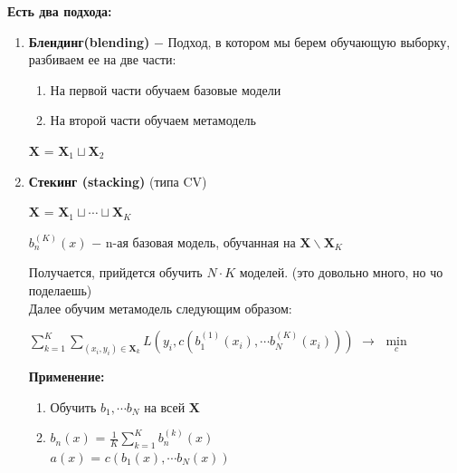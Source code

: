             \textbf{Есть два подхода:}
            \begin{enumerate}
                \item \textbf{Блендинг(blending)} $-$ Подход, в котором мы берем обучающую выборку, разбиваем ее на две части:
                \begin{enumerate}
                    \item На первой части обучаем базовые модели
                    \item На второй части обучаем метамодель
                \end{enumerate}

                \begin{center}
                    $\mathbf{X}$ = $\mathbf{X}_1 \sqcup \mathbf{X}_2$ 
                \end{center}

                \item \textbf{Стекинг (stacking)} (типа CV)\\

                    \begin{center}
                        $\mathbf{X}$ = $\mathbf{X}_1 \sqcup \cdots \sqcup \mathbf{X}_K$
                    \end{center}

                    \begin{center}
                        $b_n^{(K)}(x)$ $-$ n-ая базовая модель, обучанная на $\mathbf{X} \backslash \mathbf{X}_K$
                    \end{center}

                    Получается, прийдется обучить $N \cdot K$ моделей. (это довольно много, но чо поделаешь)\\

                    Далее обучим метамодель следующим образом:
                    \begin{center}
                        \large
                        $\sum\limits_{k = 1}^K\sum\limits_{(x_i, y_i) \in \mathbf{X}_k}L(y_i, c(b_1^{(1)}(x_i), \cdots b_N^{(K)}(x_i)))$ $\longrightarrow$ $\min\limits_c$
                    \end{center}


                    \textbf{Применение:}
                    \begin{enumerate}
                        \item Обучить $b_1, \cdots b_N$ на всей $\mathbf{X}$

                        \item $b_n(x)$ = $\frac{1}{K}\sum\limits_{k = 1}^Kb_n^{(k)}(x)$\\

                        $a(x)$ = $c(b_1(x), \cdots b_N(x))$
                    \end{enumerate}
            \end{enumerate}
